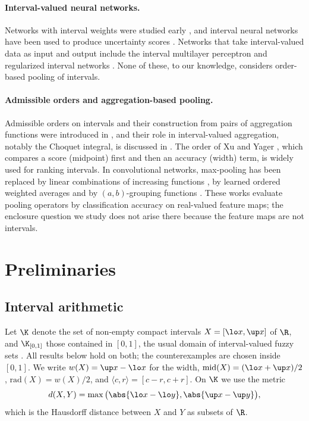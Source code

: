 \paragraph{Interval-valued neural networks.} Networks with interval weights were studied early \cite{kwon1994}, and interval neural networks have been used to produce uncertainty scores \cite{oala2020}. Networks that take interval-valued data as input and output include the interval multilayer perceptron \cite{roque2007} and regularized interval networks \cite{yang2019rann}. None of these, to our knowledge, considers order-based pooling of intervals.

\paragraph{Admissible orders and aggregation-based pooling.} Admissible orders on intervals and their construction from pairs of aggregation functions were introduced in \cite{bustince2013orders}, and their role in interval-valued aggregation, notably the Choquet integral, is discussed in \cite{bustince2013choquet}. The order of Xu and Yager \cite{xu2006}, which compares a score (midpoint) first and then an accuracy (width) term, is widely used for ranking intervals. In convolutional networks, max-pooling has been replaced by linear combinations of increasing functions \cite{rodriguez2022}, by learned ordered weighted averages \cite{forcen2020} and by $(a,b)$-grouping functions \cite{rodriguez2023}. These works evaluate pooling operators by classification accuracy on real-valued feature maps; the enclosure question we study does not arise there because the feature maps are not intervals.

\section{Preliminaries}
\label{sec:prelim}

\subsection{Interval arithmetic}

Let $\K$ denote the set of non-empty compact intervals $X=[\lo x,\up x]$ of $\R$, and $\K_{[0,1]}$ those contained in $[0,1]$, the usual domain of interval-valued fuzzy sets \cite{zadeh1975}. All results below hold on both; the counterexamples are chosen inside $[0,1]$. We write $w(X)=\up x-\lo x$ for the width, $\mathrm{mid}(X)=(\lo x+\up x)/2$, $\mathrm{rad}(X)=w(X)/2$, and $\langle c,r\rangle=[c-r,c+r]$. On $\K$ we use the metric
\[
d(X,Y)=\max\big(\abs{\lo x-\lo y},\abs{\up x-\up y}\big),
\]
which is the Hausdorff distance between $X$ and $Y$ as subsets of $\R$.

